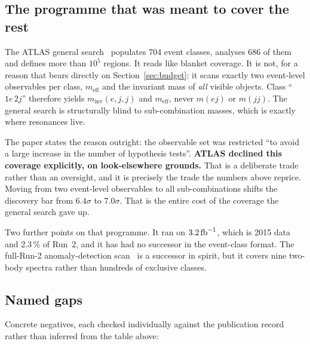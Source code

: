 \subsection{The programme that was meant to cover the rest}

The ATLAS general search~\cite{atlas_general_search} populates 704 event classes, analyses 686 of
them and defines more than $10^5$ regions. It reads like blanket coverage. It is not, for a reason
that bears directly on Section~\ref{sec:budget}: it scans exactly two event-level observables per
class, $m_{\mathrm{eff}}$ and the invariant mass of \emph{all} visible objects. Class ``$1e\,2j$''
therefore yields $m_{\mathrm{inv}}(e,j,j)$ and $m_{\mathrm{eff}}$, never $m(ej)$ or $m(jj)$. The
general search is structurally blind to sub-combination masses, which is exactly where resonances
live.

The paper states the reason outright: the observable set was restricted ``to avoid a large
increase in the number of hypothesis tests''. \textbf{ATLAS declined this coverage explicitly, on
look-elsewhere grounds.} That is a deliberate trade rather than an oversight, and it is precisely
the trade the numbers above reprice. Moving from two event-level observables to all
sub-combinations shifts the discovery bar from $6.4\sigma$ to $7.0\sigma$. That is the entire cost
of the coverage the general search gave up.

Two further points on that programme. It ran on $3.2\,\mathrm{fb}^{-1}$, which is 2015 data and 2.3\,\% of
Run~2, and it has had no successor in the event-class format. The full-Run-2 anomaly-detection
scan~\cite{atlas_ml_anomaly} is a successor in spirit, but it covers nine two-body spectra rather
than hundreds of exclusive classes.

\subsection{Named gaps}

Concrete negatives, each checked individually against the publication record rather than inferred
from the table above:

